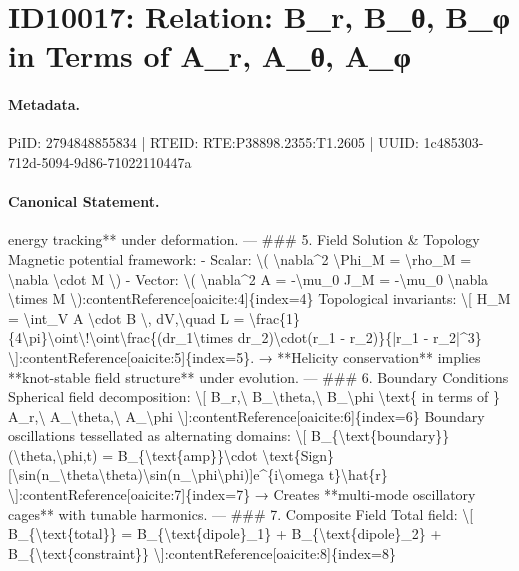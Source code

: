 \section*{ID10017: Relation: B\_r, B\_θ, B\_φ in Terms of A\_r, A\_θ, A\_φ}
\paragraph{Metadata.}
PiID: 2794848855834 | RTEID: RTE:P38898.2355:T1.2605 | UUID: 1c485303-712d-5094-9d86-71022110447a

\paragraph{Canonical Statement.}
energy tracking** under deformation. --- \#\#\# 5. Field Solution \& Topology Magnetic potential framework: - Scalar: \textbackslash{}( \textbackslash{}nabla\textasciicircum{}2 \textbackslash{}Phi\_M = \textbackslash{}rho\_M = \textbackslash{}nabla \textbackslash{}cdot M \textbackslash{}) - Vector: \textbackslash{}( \textbackslash{}nabla\textasciicircum{}2 A = -\textbackslash{}mu\_0 J\_M = -\textbackslash{}mu\_0 \textbackslash{}nabla \textbackslash{}times M \textbackslash{}):contentReference[oaicite:4]\{index=4\} Topological invariants: \textbackslash{}[ H\_M = \textbackslash{}int\_V A \textbackslash{}cdot B \textbackslash{}, dV,\textbackslash{}quad L = \textbackslash{}frac\{1\}\{4\textbackslash{}pi\}\textbackslash{}oint\textbackslash{}!\textbackslash{}oint\textbackslash{}frac\{(dr\_1\textbackslash{}times dr\_2)\textbackslash{}cdot(r\_1 - r\_2)\}\{|r\_1 - r\_2|\textasciicircum{}3\} \textbackslash{}]:contentReference[oaicite:5]\{index=5\}. → **Helicity conservation** implies **knot-stable field structure** under evolution. --- \#\#\# 6. Boundary Conditions Spherical field decomposition: \textbackslash{}[ B\_r,\textbackslash{} B\_\textbackslash{}theta,\textbackslash{} B\_\textbackslash{}phi \textbackslash{}text\{ in terms of \} A\_r,\textbackslash{} A\_\textbackslash{}theta,\textbackslash{} A\_\textbackslash{}phi \textbackslash{}]:contentReference[oaicite:6]\{index=6\} Boundary oscillations tessellated as alternating domains: \textbackslash{}[ B\_\{\textbackslash{}text\{boundary\}\}(\textbackslash{}theta,\textbackslash{}phi,t) = B\_\{\textbackslash{}text\{amp\}\}\textbackslash{}cdot \textbackslash{}text\{Sign\}[\textbackslash{}sin(n\_\textbackslash{}theta\textbackslash{}theta)\textbackslash{}sin(n\_\textbackslash{}phi\textbackslash{}phi)]e\textasciicircum{}\{i\textbackslash{}omega t\}\textbackslash{}hat\{r\} \textbackslash{}]:contentReference[oaicite:7]\{index=7\} → Creates **multi-mode oscillatory cages** with tunable harmonics. --- \#\#\# 7. Composite Field Total field: \textbackslash{}[ B\_\{\textbackslash{}text\{total\}\} = B\_\{\textbackslash{}text\{dipole\}\_1\} + B\_\{\textbackslash{}text\{dipole\}\_2\} + B\_\{\textbackslash{}text\{constraint\}\} \textbackslash{}]:contentReference[oaicite:8]\{index=8\}

